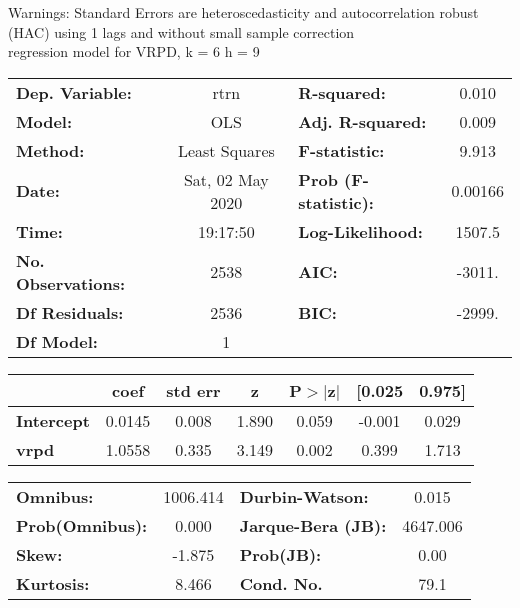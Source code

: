Warnings: \newline
 [1] Standard Errors are heteroscedasticity and autocorrelation robust (HAC) using 1 lags and without small sample correction\\ 

regression model for VRPD, k = 6 h = 9\begin{center}
\begin{tabular}{lclc}
\toprule
\textbf{Dep. Variable:}    &       rtrn       & \textbf{  R-squared:         } &     0.010   \\
\textbf{Model:}            &       OLS        & \textbf{  Adj. R-squared:    } &     0.009   \\
\textbf{Method:}           &  Least Squares   & \textbf{  F-statistic:       } &     9.913   \\
\textbf{Date:}             & Sat, 02 May 2020 & \textbf{  Prob (F-statistic):} &  0.00166    \\
\textbf{Time:}             &     19:17:50     & \textbf{  Log-Likelihood:    } &    1507.5   \\
\textbf{No. Observations:} &        2538      & \textbf{  AIC:               } &    -3011.   \\
\textbf{Df Residuals:}     &        2536      & \textbf{  BIC:               } &    -2999.   \\
\textbf{Df Model:}         &           1      & \textbf{                     } &             \\
\bottomrule
\end{tabular}
\begin{tabular}{lcccccc}
                   & \textbf{coef} & \textbf{std err} & \textbf{z} & \textbf{P$> |$z$|$} & \textbf{[0.025} & \textbf{0.975]}  \\
\midrule
\textbf{Intercept} &       0.0145  &        0.008     &     1.890  &         0.059        &       -0.001    &        0.029     \\
\textbf{vrpd}      &       1.0558  &        0.335     &     3.149  &         0.002        &        0.399    &        1.713     \\
\bottomrule
\end{tabular}
\begin{tabular}{lclc}
\textbf{Omnibus:}       & 1006.414 & \textbf{  Durbin-Watson:     } &    0.015  \\
\textbf{Prob(Omnibus):} &   0.000  & \textbf{  Jarque-Bera (JB):  } & 4647.006  \\
\textbf{Skew:}          &  -1.875  & \textbf{  Prob(JB):          } &     0.00  \\
\textbf{Kurtosis:}      &   8.466  & \textbf{  Cond. No.          } &     79.1  \\
\bottomrule
\end{tabular}
\end{center}

